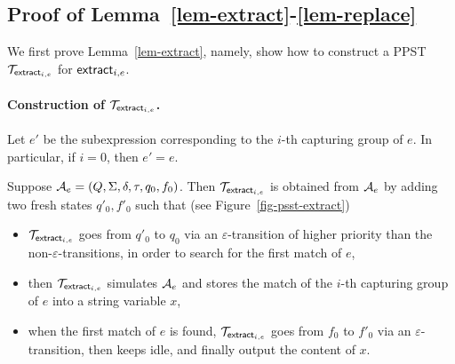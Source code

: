 
%


 
\subsection{Proof of Lemma~\ref{lem-extract}-\ref{lem-replace}}

We first prove Lemma~\ref{lem-extract}, namely, show how to construct a PPST $\mathcal{T}_{\mathsf{extract}_{i,e}}$ for $\mathsf{extract}_{i,e}$.

\paragraph*{Construction of $\mathcal{T}_{\mathsf{extract}_{i,e}}$.} 
Let $e'$ be the subexpression corresponding to the $i$-th capturing group of $e$. In particular, if $i=0$, then $e' = e$. 

Suppose $\mathcal{A}_e = (Q, \Sigma, \delta, \tau, q_0, f_0)$. Then $\mathcal{T}_{\mathsf{extract}_{i,e}}$ is obtained from $\mathcal{A}_e$ by adding two fresh states $q'_0, f'_0$ such that (see Figure~\ref{fig-psst-extract})
\begin{itemize}
\item $\mathcal{T}_{\mathsf{extract}_{i,e}}$ goes from $q'_0$ to $q_0$ via an $\varepsilon$-transition of higher priority than the non-$\varepsilon$-transitions, in order to search for the first match of $e$, 
%
\item then $\mathcal{T}_{\mathsf{extract}_{i,e}}$ simulates $\mathcal{A}_e$ and stores the match of the $i$-th capturing group of $e$ into a string variable $x$,  
%
\item when the first match of $e$ is found, $\mathcal{T}_{\mathsf{extract}_{i,e}}$ goes from $f_0$ to $f'_0$ via an $\varepsilon$-transition, then keeps idle, and finally output the content of $x$.
\end{itemize}

